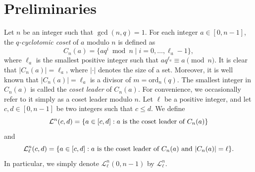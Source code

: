\documentclass[journal,onecolumn]{IEEEtran}
\begin{document}
\section{Preliminaries}\label{pre}
Let \( n \) be an integer such that \( \gcd(n, q) = 1 \).  
For each integer \( a \in [0, n-1] \), the \emph{\( q \)-cyclotomic coset} of \( a \) modulo \( n \) is defined as 
\begin{equation}\label{def1}
C_n(a) = \{ a q^{i} \bmod n \mid i = 0, \ldots, \ell_a - 1 \},
\end{equation}
where \( \ell_a \) is the smallest positive integer such that \( a q^{\ell_a} \equiv a \pmod{n} \).  
It is clear that $|C_n(a )|=\ell_a$, where $|\cdot|$ denotes the size of a set.  Moreover, it is well known that $|C_n(a)|=\ell_a$ is  a divisor of \( m = \mathrm{ord}_n(q) \).  
The smallest integer in \( C_n(a) \) is called the \emph{coset leader} of $C_n(a)$.  For convenience, we  occasionally refer to it simply as a
coset leader modulo $n$.
Let \( \ell \) be  a positive integer, 
and  let \( c, d \in [0, n-1] \) be two integers such that \( c \leq d \).  
We define 
\begin{equation}\notag
\mathcal{L}^n(c,d) = \{ a \in [c,d] : a \text{ is the coset leader of } C_n(a) \}
\end{equation}
and
\begin{equation}\notag
\mathcal{L}^n_{\ell}(c,d) = \{ a \in [c,d] : a \text{ is the coset leader of } C_n(a) \text{ and } |C_n(a)| = \ell \}.
\end{equation}
In particular, we simply denote $\mathcal{L}^n_{\ell}(0,n-1)$ by $\mathcal{L}^n_{\ell}$.
\end{document}
